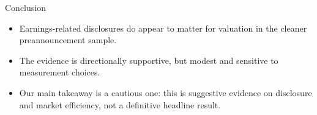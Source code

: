 \documentclass[aspectratio=169,11pt]{beamer}
\begin{document}
\begin{frame}{Conclusion}
\begin{itemize}
  \item Earnings-related disclosures do appear to matter for valuation in the cleaner preannouncement sample.
  \item The evidence is directionally supportive, but modest and sensitive to measurement choices.
  \item Our main takeaway is a cautious one: this is suggestive evidence on disclosure and market efficiency, not a definitive headline result.
\end{itemize}
\end{frame}
\end{document}
